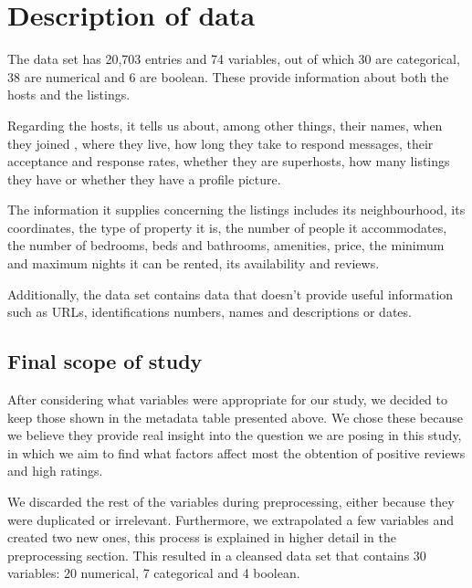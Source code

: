 


\section{Description of data}%
\label{sec:description_of_data}

The data set has 20,703 entries and 74 variables, out of which 30 are categorical,
38 are numerical and 6 are boolean. These provide information about both the hosts 
and the listings.

Regarding the hosts, it tells us about, among other things, their
names, when they joined \airbnb, where they live, how long they take to respond 
messages, their acceptance and response rates, whether they are superhosts, how 
many listings they have or whether they have a profile picture.

The information it supplies concerning the listings includes its
neighbourhood, its coordinates, the type of property it is, the number of people 
it accommodates, the number of bedrooms, beds and bathrooms, amenities, price, 
the minimum and maximum nights it can be rented, its availability and reviews.

Additionally, the data set contains data that doesn't provide useful information such
as URLs, identifications numbers, names and descriptions or dates.






\subsection{Final scope of study}

After considering what variables were appropriate for our study, we decided to keep 
those shown in the metadata table presented above. We chose these because
we believe they provide real insight into the question we are posing in this study,
in which we aim to find what factors affect most the obtention of positive reviews
and high ratings. 

We discarded the rest
of the variables during preprocessing, either because they were duplicated or
irrelevant. Furthermore, we extrapolated a few variables and created 
two new ones, this process is explained in higher detail in the preprocessing 
section. This resulted in a cleansed data set that contains 30 variables: 
20 numerical, 7 categorical and 4 boolean.